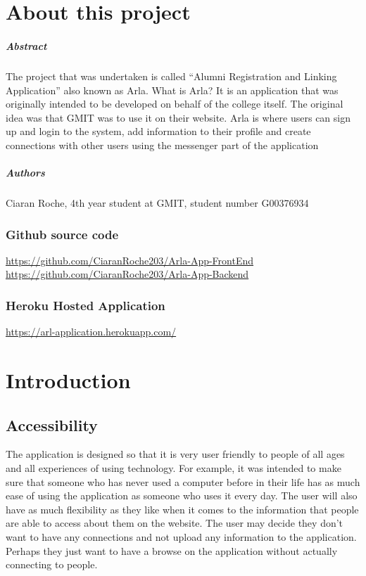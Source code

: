 
\chapter*{About this project}
\paragraph{Abstract}
The project that was undertaken is called “Alumni Registration and Linking Application” also known as Arla. What is Arla? It is an application that was originally intended to be developed on behalf of the college itself. The original idea was that GMIT was to use it on their website. Arla is where users can sign up and login to the system, add information to their profile and create connections with other users using the messenger part of the application

\paragraph{Authors}
Ciaran Roche, 4th year student at GMIT, student number G00376934\\

\subsection{Github source code}
\url{https://github.com/CiaranRoche203/Arla-App-FrontEnd}\\
\url{https://github.com/CiaranRoche203/Arla-App-Backend}\\

\subsection{Heroku Hosted Application}
\url{https://arl-application.herokuapp.com/}\\
\chapter{Introduction}

\section{Accessibility}
The application is designed so that it is very user friendly to people of all ages and all experiences of using technology. For example, it was intended to make sure that someone who has never used a computer before in their life has as much ease of using the application as someone who uses it every day. The user will also have as much flexibility as they like when it comes to the information that people are able to access about them on the website. The user may decide they don’t want to have any connections and not upload any information to the application. Perhaps they just want to have a browse on the application without actually connecting to people. 

